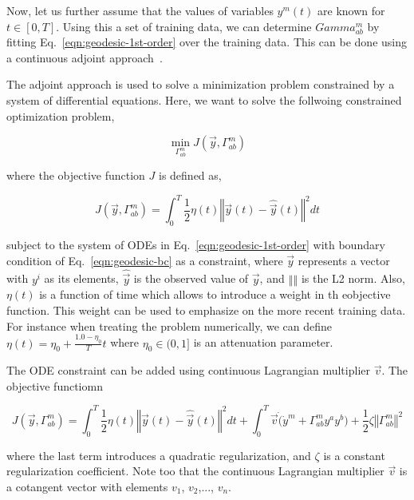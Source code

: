 \documentclass{article}
\begin{document}
Now, let us further assume that the values of variables $y^{m}(t)$ are
known for $t \in [0,T]$. Using this a set of training data, we can
determine $Gamma^{m}_{ab}$ by fitting Eq.~\ref{eqn:geodesic-1st-order}
over the training data. This can be done using a continuous adjoint
approach~\cite{ref:adjoint-giles}.

The adjoint approach is used to solve a minimization problem
constrained by a system of differential equations. Here, we want to
solve the follwoing constrained optimization problem,

\begin{equation}\label{eqn:optimization-problem}
\min_{\Gamma^{m}_{ab}} J(\vec{y},\Gamma^{m}_{ab})
\end{equation}

where the objective function $J$ is defined as,

\begin{equation}\label{eqn:optimization-objective-raw}
J(\vec{y},\Gamma^{m}_{ab}) = \int_{0}^{T} \frac{1}{2} \eta(t) \left\Vert
\vec{y}(t) - \hat{\vec{y}}(t) \right\Vert^{2} dt
\end{equation}

subject to the system of ODEs in Eq.~\ref{eqn:geodesic-1st-order} with
boundary condition of Eq.~\ref{eqn:geodesic-bc} as a constraint, where
$\vec{y}$ represents a vector with $y^{i}$ as its elements,
$\hat{\vec{y}}$ is the observed value of $\vec{y}$, and $\left\Vert
\right\Vert$ is the L2 norm. Also, $\eta(t)$ is a function of time
which allows to introduce a weight in th eobjective function. This
weight can be used to emphasize on the more recent training data. For
instance when treating the problem numerically, we can define $\eta(t)
= \eta_{0} + \frac{1.0 - \eta_{0}}{T} t$ where $\eta_{0} \in (0,1]$ is
  an attenuation parameter.

The ODE constraint can be added using continuous Lagrangian multiplier
$\vec{v}$. The objective functiomn

\begin{equation}\label{eqn:optimization-objective}
J(\vec{y},\Gamma^{m}_{ab}) = \int_{0}^{T} \frac{1}{2} \eta(t)
\left\Vert \vec{y}(t) - \hat{\vec{y}}(t) \right\Vert^{2} dt +
\int_{0}^{T} \vec{v} \dot ( \dot{y}^{m} + \Gamma^{m}_{ab} y^{a} y^{b}
) + \frac{1}{2} \zeta \left\Vert \Gamma^{m}_{ab} \right\Vert^{2}
\end{equation}

where the last term introduces a quadratic regularization, and $\zeta$
is a constant regularization coefficient. Note too that the continuous
Lagrangian multiplier $\vec{v}$ is a cotangent vector with elements
$v_{1}$, $v_{2}$,..., $v_{n}$.
\end{document}
